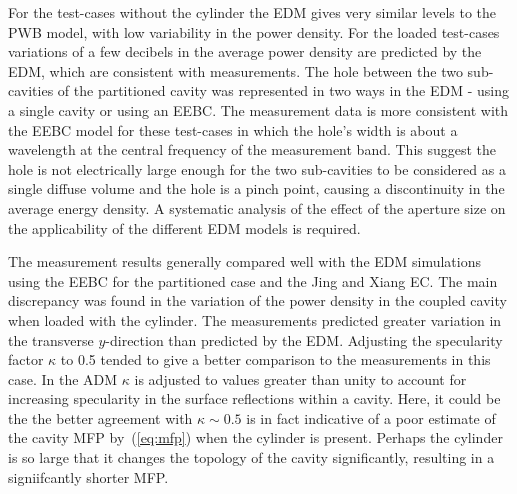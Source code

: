 \documentclass[a4paper]{article}
\numberwithin{equation}{section}
\begin{document}
For the test-cases without the cylinder the EDM gives very similar levels to the PWB model, with low
variability in the power density. For the loaded test-cases variations of a few decibels in the average
power density are predicted by the EDM, which are consistent with measurements. The hole between the
two sub-cavities of the partitioned cavity was represented in two ways in the EDM - using a single 
cavity or using an EEBC. The measurement data is more consistent with the EEBC model for these
test-cases in which the hole's width is about a wavelength at the central frequency of the measurement
band. This suggest the hole is not electrically large enough for the two sub-cavities to be considered
as a single diffuse volume and the hole is a pinch point, causing a discontinuity in the average 
energy density. A systematic analysis of the effect of the aperture size on the applicability of the
different EDM models is required.

The measurement results generally compared well with the EDM simulations using the EEBC for the partitioned
case and the Jing and Xiang EC. The main discrepancy was found in the variation of the power density in the
coupled cavity when loaded with the cylinder. The measurements predicted greater variation in the transverse
$y$-direction than predicted by the EDM. Adjusting the specularity factor $\kappa$ to 0.5 tended to give a
better comparison to the measurements in this case. In the ADM $\kappa$ is adjusted to values greater than
unity to account for increasing specularity in the surface reflections within a cavity. Here, it could be 
the the better agreement with $\kappa\sim 0.5$ is in fact indicative of a poor estimate of the cavity
MFP by~(\ref{eq:mfp}) when the cylinder is present. Perhaps the cylinder is so large that it changes the
topology of the cavity significantly, resulting in a signiifcantly shorter MFP.


%



\appendix



\end{document}
